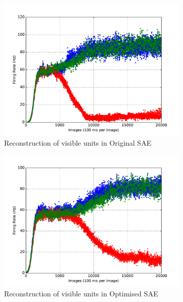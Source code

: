 \begin{figure}
\begin{subfigure}[t]{0.32\textwidth}
		\includegraphics[width=\textwidth]{pics_sdlm/00_exp_SAE_Orig/exp3_recon_s_2.pdf}
		\caption{Reconstruction of visible units in Original SAE}
	\end{subfigure}
	\begin{subfigure}[t]{0.32\textwidth}
		\includegraphics[width=\textwidth]{pics_sdlm/07_exp_SAE_all_long/exp3_recon_s_2.pdf}
		\caption{Reconstruction of visible units in Optimised SAE}
	\end{subfigure}\\
	\begin{subfigure}[t]{0.32\textwidth}

\end{subfigure}
\end{figure}
